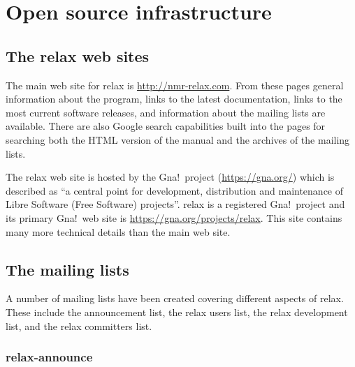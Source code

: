 
\chapter{Open source infrastructure}




\section{The relax web sites}

The main web site for relax is \href{http://nmr-relax.com}{http://nmr-relax.com}.  From these pages general information about the program, links to the latest documentation, links to the most current software releases, and information about the mailing lists are available.  There are also Google search capabilities built into the pages for searching both the HTML version of the manual and the archives of the mailing lists.

The relax web site is hosted by the Gna!\ project (\href{https://gna.org/}{https://gna.org/}) which is described as ``a central point for development, distribution and maintenance of Libre Software (Free Software) projects''.  relax is a registered Gna!\ project and its primary Gna!\ web site is \href{https://gna.org/projects/relax}{https://gna.org/projects/relax}.  This site contains many more technical details than the main web site.




\section{The mailing lists}

A number of mailing lists have been created covering different aspects of relax.  These include the announcement list, the relax users list, the relax development list, and the relax committers list.


\subsection{relax-announce}

